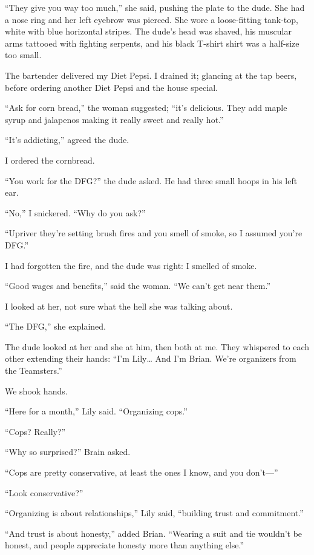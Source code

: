 ``They give you way too much,'' she said, pushing the plate to the dude.
She had a nose ring and her left eyebrow was pierced. She wore a
loose-fitting tank-top, white with blue horizontal stripes. The dude's
head was shaved, his muscular arms tattooed with fighting serpents, and
his black T-shirt shirt was a half-size too small.

The bartender delivered my Diet Pepsi. I drained it; glancing at the tap
beers, before ordering another Diet Pepsi and the house special.

``Ask for corn bread,'' the woman suggested; ``it's delicious. They add
maple syrup and jalapenos making it really sweet and really hot.''

``It's addicting,'' agreed the dude.

I ordered the cornbread.

``You work for the DFG?'' the dude asked. He had three small hoops in
his left ear.

``No,'' I snickered. ``Why do you ask?''

``Upriver they're setting brush fires and you smell of smoke, so I
assumed you're DFG.''

I had forgotten the fire, and the dude was right: I smelled of smoke.

``Good wages and benefits,'' said the woman. ``We can't get near them.''

I looked at her, not sure what the hell she was talking about.

``The DFG,'' she explained.

The dude looked at her and she at him, then both at me. They whispered
to each other extending their hands: ``I'm Lily\ldots{} And I'm Brian.
We're organizers from the Teamsters.''

We shook hands.

``Here for a month,'' Lily said. ``Organizing cops.''

``Cops? Really?''

``Why so surprised?'' Brain asked.

``Cops are pretty conservative, at least the ones I know, and you
don't---''

``Look conservative?''

``Organizing is about relationships,'' Lily said, ``building trust and
commitment.''

``And trust is about honesty,'' added Brian. ``Wearing a suit and tie
wouldn't be honest, and people appreciate honesty more than anything
else.''

